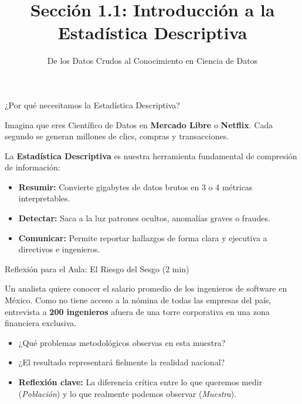 \documentclass[10pt,aspectratio=169]{beamer}
\title[Estadística Descriptiva]{Sección 1.1: Introducción a la Estadística Descriptiva}
\subtitle{De los Datos Crudos al Conocimiento en Ciencia de Datos}
\begin{document}
\begin{frame}
  \vspace{-1.2cm}
  \titlepage
\end{frame}

\begin{frame}{¿Por qué necesitamos la Estadística Descriptiva?}
  \begin{motivacion}
    Imagina que eres Científico de Datos en \textbf{Mercado Libre} o \textbf{Netflix}. Cada segundo se generan millones de clics, compras y transacciones.
  \end{motivacion}
  
  \vspace{0.6em}
  La \textbf{Estadística Descriptiva} es nuestra herramienta fundamental de compresión de información:
  \begin{itemize}
    \item \textbf{Resumir:} Convierte gigabytes de datos brutos en 3 o 4 métricas interpretables. \pause
    \item \textbf{Detectar:} Saca a la luz patrones ocultos, anomalías graves o fraudes. \pause
    \item \textbf{Comunicar:} Permite reportar hallazgos de forma clara y ejecutiva a directivos e ingenieros.
  \end{itemize}
\end{frame}

\begin{frame}{Reflexión para el Aula: El Riesgo del Sesgo (2 min)}
  \begin{reflexion}
    Un analista quiere conocer el salario promedio de los ingenieros de software en México. Como no tiene acceso a la nómina de todas las empresas del país, entrevista a \textbf{200 ingenieros} afuera de una torre corporativa en una zona financiera exclusiva.
  \end{reflexion}
  
  \vspace{0.8em}
  \pause
  \begin{itemize}
    \item ¿Qué problemas metodológicos observas en esta muestra? \pause
    \item ¿El resultado representará fielmente la realidad nacional? \pause
    \item \textbf{Reflexión clave:} La diferencia crítica entre lo que queremos medir (\emph{Población}) y lo que realmente podemos observar (\emph{Muestra}).
  \end{itemize}
\end{frame}
\end{document}
